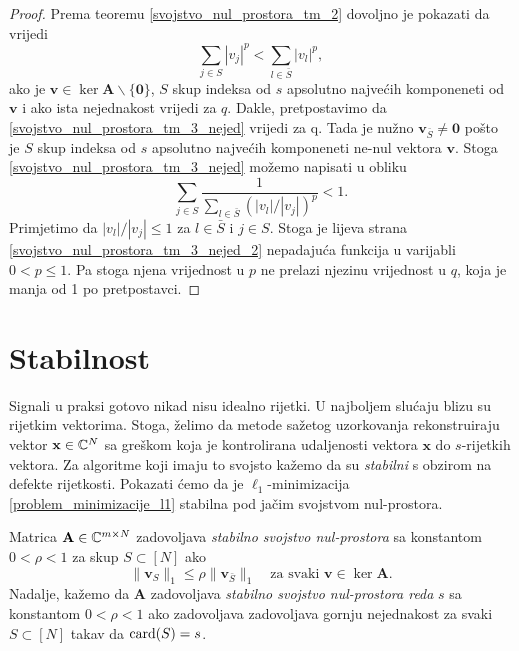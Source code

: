 \documentclass[a4paper,twoside,12pt]{memoir} %
\newcommand{\vect}[1]{\mathbf{#1}}
\renewcommand{\vec}{\vect}
\newcommand{\card}{\text{\normalfont{card}}}
\newcommand{\norm}[1]{\|{#1}\|}
\begin{document}
\begin{proof}
    Prema teoremu \ref{svojstvo_nul_prostora_tm_2} dovoljno je pokazati da vrijedi
    \begin{equation}\label{svojstvo_nul_prostora_tm_3_nejed}
        \sum_{j \in S} |v_j|^p < \sum_{l \in \bar S}|v_l|^p,
    \end{equation}
    ako je $\vec v \in \ker \vec A \backslash \{\vec 0\}$, $S$ skup indeksa od $s$ apsolutno najve\'cih komponeneti od $\vec v$ i ako ista nejednakost vrijedi za $q$.
    Dakle, pretpostavimo da \eqref{svojstvo_nul_prostora_tm_3_nejed} vrijedi za q. Tada je nu\v{z}no $\vec v_{\bar S} \neq \vec 0$ po\v{s}to je $S$ skup indeksa od $s$ apsolutno najve\'cih komponeneti ne-nul vektora $\vec v$. Stoga \eqref{svojstvo_nul_prostora_tm_3_nejed} mo\v{z}emo napisati u obliku
    \begin{equation}\label{svojstvo_nul_prostora_tm_3_nejed_2}
        \sum_{j \in S} \frac{1}{\sum_{l \in \bar S}(|v_l|/|v_j|)^p} < 1.  
    \end{equation}
    Primjetimo da $|v_l|/|v_j| \leq 1$ za $l \in \bar S$ i $j \in S$. Stoga je lijeva strana \eqref{svojstvo_nul_prostora_tm_3_nejed_2} nepadaju\'ca funkcija u varijabli $0<p \leq 1$. Pa stoga njena vrijednost u $p$ ne prelazi njezinu vrijednost u $q$, koja je manja od 1 po pretpostavci.
\end{proof}

\section[Stabilnost][Stabilnost]{Stabilnost}
Signali u praksi gotovo nikad nisu idealno rijetki. U najboljem slu\'caju blizu su rijetkim vektorima. Stoga, \v{z}elimo da metode sa\v{z}etog uzorkovanja rekonstruiraju vektor $\vec x \in \C^N$ sa gre\v{s}kom koja je kontrolirana udaljenosti vektora $\vec x$ do $s$-rijetkih vektora. Za algoritme koji imaju to svojsto ka\v{z}emo da su \textit{stabilni} s obzirom na defekte rijetkosti. Pokazati \'cemo da je $\ell_1$-minimizacija \eqref{problem_minimizacije_l1} stabilna pod ja\v{c}im svojstvom nul-prostora.

\begin{defn}
    Matrica $\vec A \in \C^{m \times N}$ zadovoljava \textit{stabilno svojstvo nul-prostora} sa konstantom $0<\rho<1$ za skup $S \subset [N]$ ako
    \begin{equation*}
        \norm{\vec v_S}_1 \leq \rho \norm{\vec v_{\bar S}}_1 \quad \text{za svaki }\vec v \in \ker \vec A.
    \end{equation*}
    Nadalje, ka\v{z}emo da $\vec A$ zadovoljava \textit{stabilno svojstvo nul-prostora reda} $s$ sa konstantom $0<\rho<1$ ako zadovoljava zadovoljava gornju nejednakost za svaki $S \subset [N]$ takav da $\card(S)=s$.
\end{defn}
\end{document}
